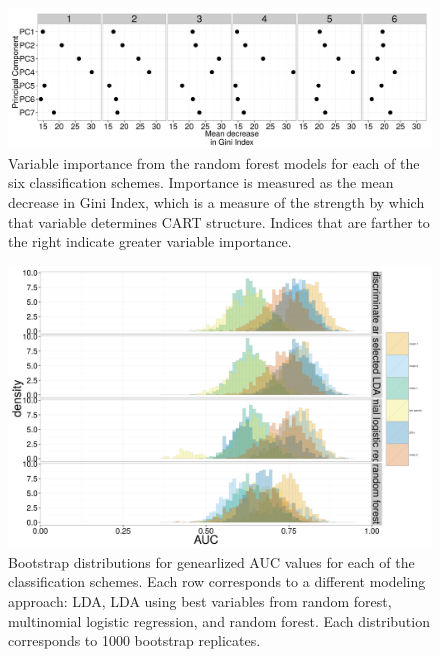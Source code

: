 \documentclass[12pt,letterpaper]{article}
\begin{document}
\begin{figure}[ht]
  \centering
  \includegraphics[height = \textheight, width = \textwidth, keepaspectratio = true]{figure/var_imp}
  \caption{Variable importance from the random forest models for each of the six classification schemes. Importance is measured as the mean decrease in Gini Index, which is a measure of the strength by which that variable determines CART structure. Indices that are farther to the right indicate greater variable importance.}
  \label{fig:var_imp}
\end{figure}

\begin{figure}[ht]
  \centering
  \includegraphics[height = \textheight, width = \textwidth, keepaspectratio = true]{figure/gen_res}
  \caption{Bootstrap distributions for genearlized AUC values for each of the classification schemes. Each row corresponds to a different modeling approach: LDA, LDA using best variables from random forest, multinomial logistic regression, and random forest. Each distribution corresponds to 1000 bootstrap replicates.}
  \label{fig:gen_hist}
\end{figure}
\end{document}
